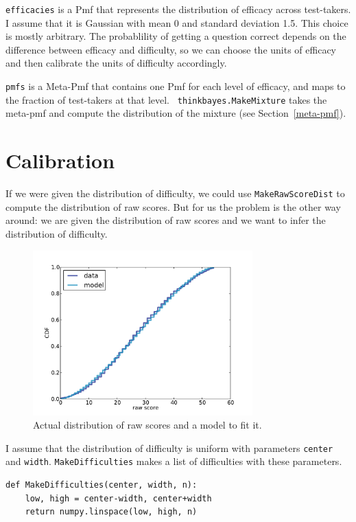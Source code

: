 \documentclass[12pt]{book}
\begin{document}
{\tt efficacies} is a Pmf that represents the distribution of efficacy
across test-takers.  I assume that it is Gaussian with mean 0 and
standard deviation 1.5.  This choice is mostly arbitrary.  The
probablility of getting a question correct depends on the difference
between efficacy and difficulty, so we can choose the units of
efficacy and then calibrate the units of difficulty accordingly.

{\tt pmfs} is a Meta-Pmf that contains one Pmf for each level of
efficacy, and maps to the fraction of test-takers at that level.  {\tt
  thinkbayes.MakeMixture} takes the meta-pmf and compute the
distribution of the mixture (see Section~\ref{meta-pmf}).


\section{Calibration}

If we were given the distribution of difficulty, we could use
\verb"MakeRawScoreDist" to compute the distribution of raw scores.
But for us the problem is the other way around: we are given the
distribution of raw scores and we want to infer the distribution of
difficulty.

\begin{figure}
\centerline{\includegraphics[height=2.5in]{figs/sat_calibrate.pdf}}
\caption{Actual distribution of raw scores and a model to fit it.}
\label{fig.satcalibrate}
\end{figure}

I assume that the distribution of difficulty is uniform with
parameters {\tt center} and {\tt width}.  {\tt MakeDifficulties}
makes a list of difficulties with these parameters.

\begin{verbatim}
def MakeDifficulties(center, width, n):
    low, high = center-width, center+width
    return numpy.linspace(low, high, n)
\end{verbatim}
\end{document}
